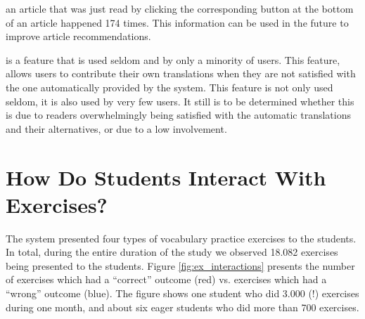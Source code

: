  an article that was just read by clicking the corresponding button at the bottom of an article happened 174 times. This information can be used in the future to improve article recommendations.

 is a feature that is used seldom and by only a minority of users. This feature, allows users to contribute their own translations when they are not satisfied with the one automatically provided by the system. This feature is not only used seldom, it is also used by very few users. It still is to be determined whether this is due to readers overwhelmingly being satisfied with the automatic translations and their alternatives, or due to a low involvement.







\section{How Do Students Interact With Exercises?}

The system presented four types of vocabulary practice exercises to the students. In total, during the entire duration of the study we observed 18.082 exercises being presented to the students. Figure \ref{fig:ex_interactions} presents the number of exercises which had a ``correct'' outcome (red) vs. exercises which had a ``wrong'' outcome (blue). The figure shows one student who did 3.000 (!) exercises during one month, and about six eager students who did more than 700 exercises. 

